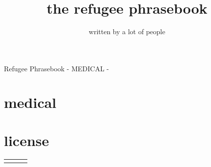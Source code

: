 \documentclass[ %
	11pt, %
	paper=a4,
	landscape,
	abstract=on,
	version=last]{scrartcl}
\author{written by a lot of people}
\title{the refugee phrasebook}
\begin{document}
{\Large Refugee Phrasebook - MEDICAL - }
\section*{medical}



\section*{license}
 \newline


\begin{longtabu}{X[l]  X[l] X[l] }
\everyrow {\tabucline[ on 1 pt ] - }
\toprule

\midrule
\endhead

\end{longtabu}
\end{document}
